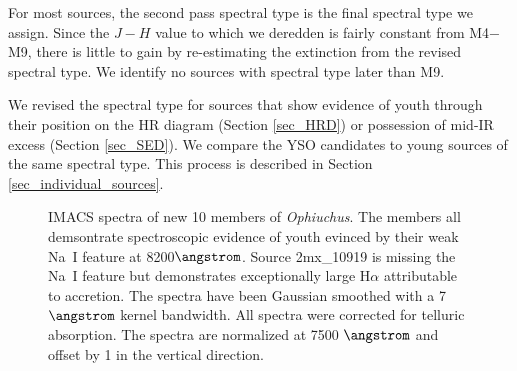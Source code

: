 For most sources, the second pass spectral type is the final spectral type we assign.  Since the $J-H$ value to which we deredden is fairly constant from M4$-$M9, there is little to gain by re-estimating the extinction from the revised spectral type.  We identify no sources with spectral type later than M9.  

We revised the spectral type for sources that show evidence of youth through their position on the HR diagram (Section \ref{sec_HRD}) or possession of mid-IR excess (Section \ref{sec_SED}).  We compare the YSO candidates to young sources of the same spectral type.  This process is described in Section \ref{sec_individual_sources}.


\begin{figure}[ht!]
\caption{IMACS spectra of new 10 members of \emph{Ophiuchus}.  The members all demsontrate spectroscopic evidence of youth evinced by their weak Na~I feature at 8200$\angstrom$.  Source 2mx\_10919 is missing the Na~I feature but demonstrates exceptionally large H$\alpha$ attributable to accretion.  The spectra have been Gaussian smoothed with a 7$\angstrom$ kernel bandwidth.  All spectra were corrected for telluric absorption.  The spectra are normalized at 7500 $\angstrom$ and offset by 1 in the vertical direction. \label{fig_IMACS_spectra1} }
\centering

\end{figure}
